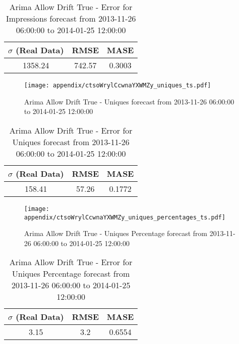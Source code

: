 \begin{table}[H]
\centering
\footnotesize
\begin{tabular}{ccc}
$\sigma$ (Real Data) & RMSE & MASE   \\ \hline
1358.24 & 742.57 & 0.3003 \\
\end{tabular}

\vspace{0.5cm}

\caption{
Arima Allow Drift True - Error for Impressions forecast from 2013-11-26 06:00:00 to 2014-01-25 12:00:00}
\end{table}

\begin{figure}[H] \begin{center} \leavevmode
\texttt{[image: appendix/ctsoWrylCcwnaYXWMZy\_uniques\_ts.pdf]} \caption{
Arima Allow Drift True - Uniques forecast from 2013-11-26 06:00:00 to 2014-01-25 12:00:00} \label{fig:appendix/ctsoWrylCcwnaYXWMZy_uniques_ts.pdf} \end{center}
\end{figure}

\begin{table}[H]
\centering
\footnotesize
\begin{tabular}{ccc}
$\sigma$ (Real Data) & RMSE & MASE   \\ \hline
158.41 & 57.26 & 0.1772 \\
\end{tabular}

\vspace{0.5cm}

\caption{
Arima Allow Drift True - Error for Uniques forecast from 2013-11-26 06:00:00 to 2014-01-25 12:00:00}
\end{table}

\begin{figure}[H] \begin{center} \leavevmode
\texttt{[image: appendix/ctsoWrylCcwnaYXWMZy\_uniques\_percentages\_ts.pdf]} \caption{
Arima Allow Drift True - Uniques Percentage forecast from 2013-11-26 06:00:00 to 2014-01-25 12:00:00} \label{fig:appendix/ctsoWrylCcwnaYXWMZy_uniques_percentages_ts.pdf} \end{center}
\end{figure}

\begin{table}[H]
\centering
\footnotesize
\begin{tabular}{ccc}
$\sigma$ (Real Data) & RMSE & MASE   \\ \hline
3.15 & 3.2 & 0.6554 \\
\end{tabular}

\vspace{0.5cm}

\caption{
Arima Allow Drift True - Error for Uniques Percentage forecast from 2013-11-26 06:00:00 to 2014-01-25 12:00:00}
\end{table}

